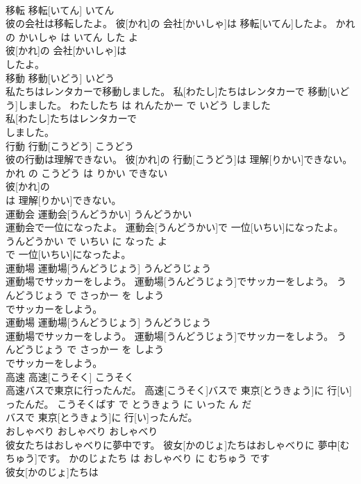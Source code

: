 \documentclass[8pt]{extreport}
\begin{document}
\begin{CJK}{UTF8}{min}
\\	移転	移転[いてん]	いてん	
\\	彼の会社は移転したよ。	彼[かれ]の 会社[かいしゃ]は 移転[いてん]したよ。	かれ の かいしゃ は いてん した よ	
\\	彼[かれ]の 会社[かいしゃ]は
\\	したよ。			
\\	移動	移動[いどう]	いどう	
\\	私たちはレンタカーで移動しました。	私[わたし]たちはレンタカーで 移動[いどう]しました。	わたしたち は れんたかー で いどう しました	
\\	私[わたし]たちはレンタカーで
\\	しました。			
\\	行動	行動[こうどう]	こうどう	
\\	彼の行動は理解できない。	彼[かれ]の 行動[こうどう]は 理解[りかい]できない。	かれ の こうどう は りかい できない	
\\	彼[かれ]の
\\	は 理解[りかい]できない。			
\\	運動会	運動会[うんどうかい]	うんどうかい	
\\	運動会で一位になったよ。	運動会[うんどうかい]で 一位[いちい]になったよ。	うんどうかい で いちい に なった よ	
\\	で 一位[いちい]になったよ。			
\\	運動場	運動場[うんどうじょう]	うんどうじょう	
\\	運動場でサッカーをしよう。	運動場[うんどうじょう]でサッカーをしよう。	うんどうじょう で さっかー を しよう	
\\	でサッカーをしよう。			
\\	運動場	運動場[うんどうじょう]	うんどうじょう	
\\	運動場でサッカーをしよう。	運動場[うんどうじょう]でサッカーをしよう。	うんどうじょう で さっかー を しよう	
\\	でサッカーをしよう。			
\\	高速	高速[こうそく]	こうそく	
\\	高速バスで東京に行ったんだ。	高速[こうそく]バスで 東京[とうきょう]に 行[い]ったんだ。	こうそくばす で とうきょう に いった ん だ	
\\	バスで 東京[とうきょう]に 行[い]ったんだ。			
\\	おしゃべり	おしゃべり	おしゃべり	
\\	彼女たちはおしゃべりに夢中です。	彼女[かのじょ]たちはおしゃべりに 夢中[むちゅう]です。	かのじょたち は おしゃべり に むちゅう です	
\\	彼女[かのじょ]たちは

\end{CJK}
\end{document}
